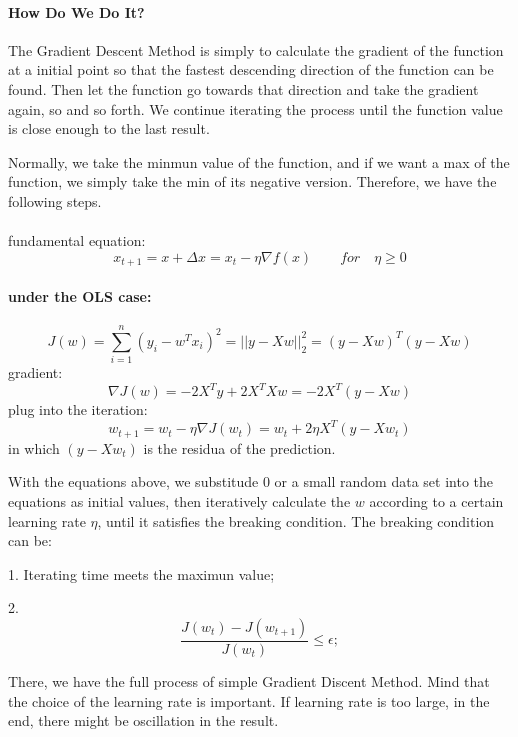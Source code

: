 \documentclass{article}
\begin{document}
	\paragraph{How Do We Do It?}
	The Gradient Descent Method is simply to calculate the gradient of the function at a initial point so that the fastest descending direction of the function can be found. Then let the function go towards that direction and take the gradient again, so and so forth. We continue iterating the process until the function value is close enough to the last result.
	
	Normally, we take the minmun value of the function, and if we want a max of the function, we simply take the min of its negative version. Therefore, we have the following steps.
	\\\\
	fundamental equation:
	\begin{displaymath}
		x_{t+1} = x + \Delta x = x_{t} - \eta \nabla f(x)\qquad for\quad \eta \ge 0
	\end{displaymath}
	\paragraph{under the OLS case:}
	\begin{displaymath}
		J(w) = \sum_{i=1}^{n}(y_i-w^Tx_i)^2 = ||y - Xw||^2_2 = (y-Xw)^T(y-Xw)
	\end{displaymath}
	gradient:\begin{displaymath}
		\nabla J(w) = -2X^Ty + 2X^TXw = -2X^T(y - Xw)
	\end{displaymath}
	plug into the iteration:\begin{displaymath}
		w_{t+1} = w_t - \eta \nabla J(w_t) = w_t + 2\eta X^T(y - Xw_t)
	\end{displaymath}
	in which $(y - Xw_t)$ is the residua of the prediction.
	
	With the equations above, we substitude 0 or a small random data set into the equations as initial values, then iteratively calculate the $w$ according to a certain learning rate $\eta$, until it satisfies the breaking condition. The breaking condition can be:
	
	1. Iterating time meets the maximun value;
	
	2.\begin{equation}
		\frac{J(w_t)-J(w_{t+1})}{J(w_t)} \le \epsilon;
	\end{equation}
	
	There, we have the full process of simple Gradient Discent Method. Mind that the choice of the learning rate is important. If learning rate is too large, in the end, there might be oscillation in the result.
\end{document}
